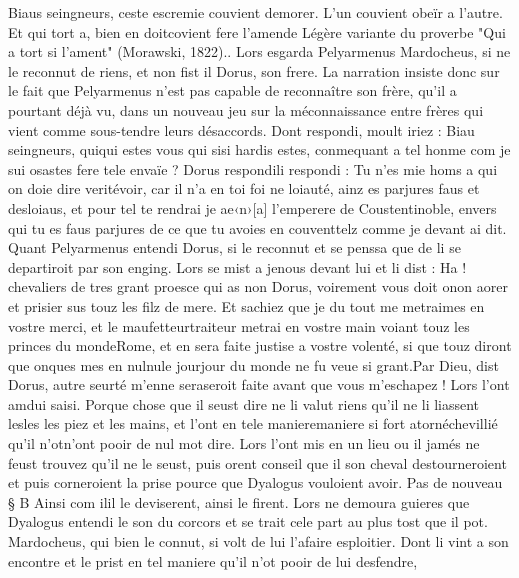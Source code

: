 \documentclass{article}
\begin{document}
\begin{pages}
   Biaus seingneurs, ceste escremie couvient demorer. L’un couvient obeïr a l’autre. 
      Et qui tort a, bien en doitcovient fere l’amende
      Légère variante du proverbe "Qui a tort si l'ament" (Morawski, 1822)..
   Lors esgarda Pelyarmenus Mardocheus, 
   si ne le reconnut de riens, et non fist il Dorus, son frere. 
   La narration insiste donc sur le fait que Pelyarmenus n'est pas capable de reconnaître son frère, qu'il a 
   pourtant déjà vu, dans un nouveau jeu sur la méconnaissance entre frères qui vient comme sous-tendre leurs désaccords.
   Dont respondi, moult iriez :
   Biau seingneurs, quiqui estes vous qui 
      sisi hardis estes, 
      conmequant 
      a tel honme com je sui osastes fere tele envaïe ?
   Dorus respondili respondi :
   Tu n’es mie homs a qui on doie dire veritévoir, 
      car il n’a en toi foi ne loiauté, ainz es parjures faus et desloiaus, et pour tel te rendrai 
      je 
      ae‹n›[a] 
      l’emperere de Coustentinoble, envers 
      qui tu es 
      faus parjures de ce que tu avoies en couventtelz comme 
         je devant ai dit. \pend
\pstart Quant Pelyarmenus entendi Dorus, 
   si le reconnut et se penssa que de li se departiroit par son enging. 
   Lors se mist a jenous devant lui et li dist :
   Ha ! chevaliers de tres grant proesce 
      qui as non Dorus, 
      voirement vous doit onon aorer et prisier sus touz les filz de mere. 
      Et sachiez que je du tout me metraimes en vostre merci, 
      et le maufetteurtraiteur 
      metrai en vostre main voiant touz les princes du mondeRome, 
      et en sera faite justise a vostre volenté, si que touz diront que onques 
      mes en nulnule 
      jourjour du monde ne fu veue si grant.Par Dieu, dist Dorus, autre seurté 
      m’enne seraseroit 
      faite avant que vous m’eschapez !
   Lors l’ont amdui saisi. Porque chose que il seust dire ne li valut riens 
   qu’il ne li liassent lesles les piez et les mains, 
   et l’ont en tele manieremaniere si fort 
   atornéchevillié qu’il 
   n'otn’ont pooir de nul mot 
   dire. Lors l’ont mis en un lieu ou il jamés ne feust trouvez qu’il ne le seust, puis orent conseil que il son cheval destourneroient 
   et puis corneroient la prise pource que Dyalogus vouloient avoir. \pend
\pstart Pas de nouveau § B
   Ainsi com ilil le deviserent, 
   ainsi le firent.
   Lors ne demoura guieres que Dyalogus entendi le son du 
   corcors et se trait cele 
   part au plus tost que il pot. Mardocheus, qui bien le connut, 
   si volt de lui l’afaire esploitier. Dont li vint a son encontre et le prist en tel maniere qu’il n’ot pooir de lui desfendre, 

\end{pages}
\end{document}
